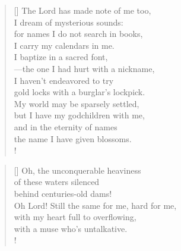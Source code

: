 \documentclass[]{article}
\begin{document}
\settowidth{\versewidth}{The Lord has made note of me too,  }
\begin{verse}[\versewidth]
The Lord has made note of me too,\\
I dream of mysterious sounds:\\
for names I do not search in books,\\
I carry my calendars in me.\\
I baptize in a sacred font,\\
—the one I had hurt with a nickname,\\
I haven't endeavored to try\\
gold locks with a burglar's lockpick.\\
My world may be sparsely settled,\\
but I have my godchildren with me,\\
and in the eternity of names\\
the name I have given blossoms.\\!
\end{verse}
\newpage 

\vspace*{0.07\textheight}
\settowidth{\versewidth}{Oh, the unconquerable heaviness  }
\begin{verse}[\versewidth]
Oh, the unconquerable heaviness\\
of these waters silenced\\
behind centuries-old dams!\\
Oh Lord! Still the same for me, hard for me,\\
with my heart full to overflowing,\\
with a muse who's untalkative.\\!
\end{verse}
\bigskip \bigskip
\end{document}

